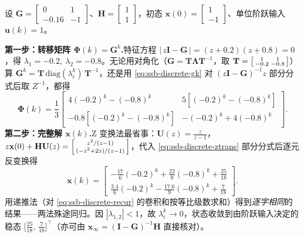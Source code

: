 \begin{example}\label{ex:ssb-discrete-sol}
设 $\mathbf{G}=\begin{bmatrix}0&1\\-0.16&-1\end{bmatrix}$、$\mathbf{H}=\begin{bmatrix}1\\1\end{bmatrix}$，初态 $\mathbf{x}(0)=\begin{bmatrix}1\\-1\end{bmatrix}$、单位阶跃输入 $\mathbf{u}(k)=1$\cite{liubao2006modern}。

\noindent \textbf{第一步：转移矩阵 $\boldsymbol{\Phi}(k)=\mathbf{G}^k$.}\;特征方程 $|\,z\mathbf{I}-\mathbf{G}\,|=(z+0.2)(z+0.8)=0$，得 $\lambda_1=-0.2,\ \lambda_2=-0.8$。无论用对角化（$\mathbf{G}=\mathbf{T}\boldsymbol{\Lambda}\mathbf{T}^{-1}$，取 $\mathbf{T}=\begin{bsmallmatrix}1&1\\-0.2&-0.8\end{bsmallmatrix}$）算 $\mathbf{G}^k=\mathbf{T}\,\mathrm{diag}(\lambda_i^k)\,\mathbf{T}^{-1}$，还是用 \cref{eq:ssb-discrete-gk} 对 $(z\mathbf{I}-\mathbf{G})^{-1}z$ 部分分式后取 $Z^{-1}$，都得
\[
  \boldsymbol{\Phi}(k)=\frac{1}{3}\begin{bmatrix}4(-0.2)^k-(-0.8)^k & 5[(-0.2)^k-(-0.8)^k]\\ -0.8[(-0.2)^k-(-0.8)^k] & -(-0.2)^k+4(-0.8)^k\end{bmatrix}.
\]
\noindent \textbf{第二步：完整解 $\mathbf{x}(k)$.}\;Z 变换法最省事：$\mathbf{U}(z)=\tfrac{z}{z-1}$，$z\mathbf{x}(0)+\mathbf{H}\mathbf{U}(z)=\begin{bsmallmatrix}z^2/(z-1)\\(-z^2+2z)/(z-1)\end{bsmallmatrix}$，代入 \cref{eq:ssb-discrete-ztrans} 部分分式后逐元反变换得
\[
  \mathbf{x}(k)=\begin{bmatrix}-\tfrac{17}{6}(-0.2)^k+\tfrac{22}{9}(-0.8)^k+\tfrac{25}{18}\\[4pt] \tfrac{3.4}{6}(-0.2)^k-\tfrac{17.6}{9}(-0.8)^k+\tfrac{7}{18}\end{bmatrix}.
\]
用递推法（对 \cref{eq:ssb-discrete-recur} 的卷积和按等比级数求和）得到\emph{逐字相同}的结果——两法殊途同归。因 $|\lambda_{1,2}|<1$，故 $\lambda_i^k\to0$，状态收敛到由阶跃输入决定的稳态 $\big[\tfrac{25}{18},\,\tfrac{7}{18}\big]^\top$（亦可由 $\mathbf{x}_\infty=(\mathbf{I}-\mathbf{G})^{-1}\mathbf{H}$ 直接核对）。
\end{example}


